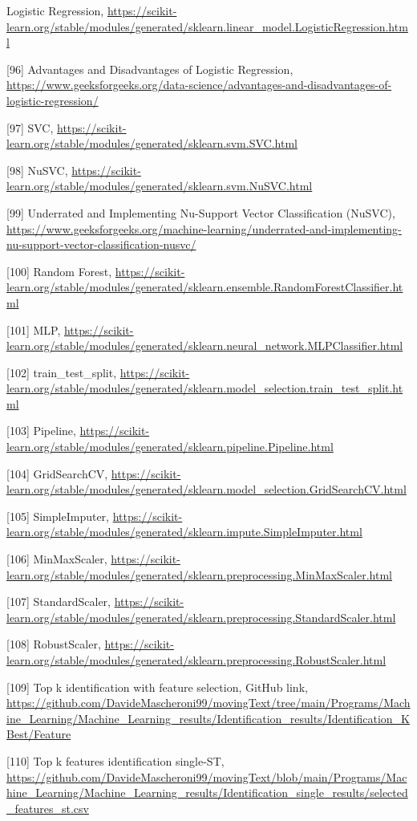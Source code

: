 \documentclass{article}
\begin{document}
\begin{raggedright}
[95] Logistic Regression, \url{https://scikit-learn.org/stable/modules/generated/sklearn.linear_model.LogisticRegression.html}

[96] Advantages and Disadvantages of Logistic Regression, \url{https://www.geeksforgeeks.org/data-science/advantages-and-disadvantages-of-logistic-regression/}

[97] SVC, \url{https://scikit-learn.org/stable/modules/generated/sklearn.svm.SVC.html}

[98] NuSVC, \url{https://scikit-learn.org/stable/modules/generated/sklearn.svm.NuSVC.html}

[99] Underrated and Implementing Nu-Support Vector Classification (NuSVC), \url{https://www.geeksforgeeks.org/machine-learning/underrated-and-implementing-nu-support-vector-classification-nusvc/}

[100] Random Forest, \url{https://scikit-learn.org/stable/modules/generated/sklearn.ensemble.RandomForestClassifier.html}

[101] MLP, \url{https://scikit-learn.org/stable/modules/generated/sklearn.neural_network.MLPClassifier.html}

[102] train\_test\_split, \url{https://scikit-learn.org/stable/modules/generated/sklearn.model_selection.train_test_split.html}

[103] Pipeline, \url{https://scikit-learn.org/stable/modules/generated/sklearn.pipeline.Pipeline.html}

[104] GridSearchCV, \url{https://scikit-learn.org/stable/modules/generated/sklearn.model_selection.GridSearchCV.html}

[105] SimpleImputer, \url{https://scikit-learn.org/stable/modules/generated/sklearn.impute.SimpleImputer.html}

[106] MinMaxScaler, \url{https://scikit-learn.org/stable/modules/generated/sklearn.preprocessing.MinMaxScaler.html}

[107] StandardScaler, \url{https://scikit-learn.org/stable/modules/generated/sklearn.preprocessing.StandardScaler.html}

[108] RobustScaler, \url{https://scikit-learn.org/stable/modules/generated/sklearn.preprocessing.RobustScaler.html}

[109] Top k identification with feature selection, GitHub link, \url{https://github.com/DavideMascheroni99/movingText/tree/main/Programs/Machine_Learning/Machine_Learning_results/Identification_results/Identification_KBest/Feature}

[110] Top k features identification single-ST, \url{https://github.com/DavideMascheroni99/movingText/blob/main/Programs/Machine_Learning/Machine_Learning_results/Identification_single_results/selected_features_st.csv}


\end{raggedright}
\end{document}
